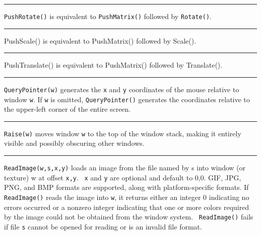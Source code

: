 \bigskip\hrule\vspace{0.1cm}

\noindent
\texttt{PushRotate()} is equivalent to \texttt{PushMatrix()} followed by
\texttt{Rotate()}.

\bigskip\hrule\vspace{0.1cm}

\noindent
{\sffamily
PushScale()\textrm{ is equivalent to }PushMatrix()\textrm{ followed by }Scale()\textrm{.}}

\bigskip\hrule\vspace{0.1cm}

\noindent
{\sffamily
PushTranslate()\textrm{ is equivalent to }PushMatrix()\textrm{ followed
by }Translate()\textrm{.}}

\bigskip\hrule\vspace{0.1cm}

\noindent
\texttt{QueryPointer(w)} generates the \texttt{x} and \texttt{y}
coordinates of the mouse relative to window \texttt{w}. If \texttt{w}
is omitted, \texttt{QueryPointer()} generates the coordinates relative
to the upper-left corner of the entire screen.

\bigskip\hrule\vspace{0.1cm}

\noindent
\texttt{Raise(w)} moves window \texttt{w} to the top of the window
stack, making it entirely visible and possibly obscuring other windows.

\bigskip\hrule\vspace{0.1cm}

\noindent
\texttt{ReadImage(w,s,x,y)} loads an image from the file named by s into
window (or texture) w at offset \texttt{x,y}. \texttt{\ x} and \texttt{y} are
optional and default to 0,0. GIF, JPG, PNG, and BMP formats are supported,
along with platform-specific formats. If \texttt{ReadImage()} reads the
image into \texttt{w}, it returns either an integer 0 indicating no
errors occurred or a nonzero integer indicating that one or more colors
required by the image could not be obtained from the window system.
\ \texttt{ReadImage()} fails if file \texttt{s} cannot be opened for
reading or is an invalid file format.


